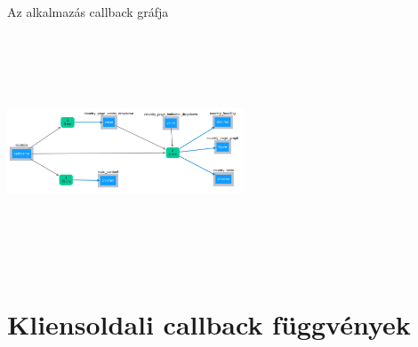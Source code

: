 \documentclass[english, aspectratio=169]{beamer}
\makeatletter
\let\origtableofcontents=\tableofcontents
\def\tableofcontents{\@ifnextchar[{\origtableofcontents}{\gobbletableofcontents}}
\def\gobbletableofcontents#1{\origtableofcontents}
\makeatother
\begin{document}
\begin{frame}[fragile]{Az alkalmazás callback gráfja}
	\begin{center}
		\includegraphics[width=7cm, height=7cm, keepaspectratio]{images/adv_8.png}
	\end{center}
\end{frame}

\section{Kliensoldali callback függvények}

\begin{frame}{}
	\tableofcontents[currentsection]
\end{frame}
\end{document}
